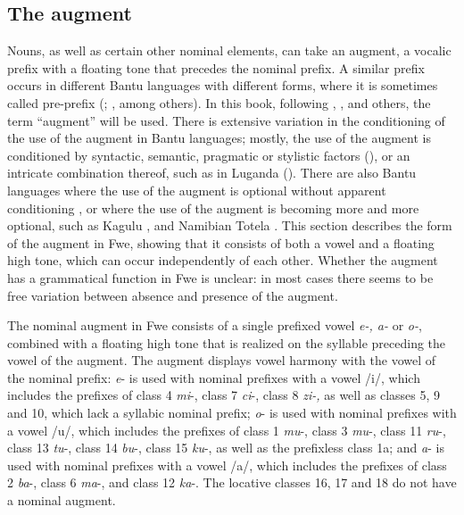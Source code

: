 \subsection{The augment}
\label{bkm:Ref444175456}\hypertarget{Toc75352637}{}
Nouns, as well as certain other nominal elements, can take an augment, a vocalic prefix with a floating tone that precedes the nominal prefix. A similar prefix occurs in different Bantu languages with different forms, where it is sometimes called pre-prefix (\citealt{Gambarage2013}; \citealt{Visser2008}, among others). In this book, following { \citet{Blois1970}}, {\citet{Katamba2003}}, {\citet{Maho1999}} and others, the term “augment” will be used. There is extensive variation in the conditioning of the use of the augment in Bantu languages; mostly, the use of the augment is conditioned by syntactic, semantic, pragmatic or stylistic factors (\citealt{Blois1970}), or an intricate combination thereof, such as in Luganda (\citealt{HymanKatamba1993}). There are also Bantu languages where the use of the augment is optional without apparent conditioning \citep[62]{Maho1998}, or where the use of the augment is becoming more and more optional, such as Kagulu \citep{Petzell2003}, and Namibian Totela \citep{Crane2019}. This section describes the form of the augment in Fwe, showing that it consists of both a vowel and a floating high tone, which can occur independently of each other. Whether the augment has a grammatical function in Fwe is unclear: in most cases there seems to be free variation between absence and presence of the augment.

The nominal augment in Fwe consists of a single prefixed vowel \textit{e-, a-} or \mbox{\textit{o-},} combined with a floating high tone that is realized on the syllable preceding the vowel of the augment. The augment displays vowel harmony with the vowel of the nominal prefix: \textit{e}- is used with nominal prefixes with a vowel /i/, which includes the prefixes of class 4 \textit{mi}-, class 7 \textit{ci}-, class 8 \textit{zi-,} as well as classes 5, 9 and 10, which lack a syllabic nominal prefix; \textit{o}- is used with nominal prefixes with a vowel /u/, which includes the prefixes of class 1 \textit{mu}-, class 3 \textit{mu}-, class 11 \textit{ru\-}-, class 13 \textit{tu}-, class 14 \textit{bu}-, class 15 \textit{ku}-, as well as the prefixless class 1a; and \textit{a}- is used with nominal prefixes with a vowel /a/, which includes the prefixes of class 2 \textit{ba}-, class 6 \textit{ma}-, and class 12 \textit{ka}-. The locative classes 16, 17 and 18 do not have a nominal augment.

